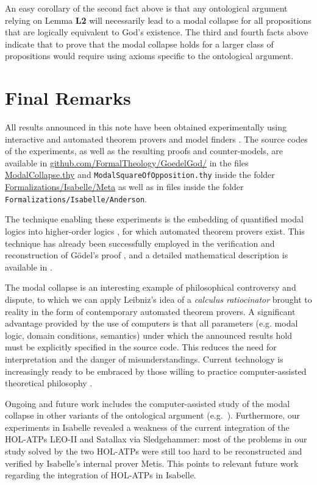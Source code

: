 \documentclass{birkmult}
\theoremstyle{definition}
\theoremstyle{remark}
\numberwithin{equation}{section}
\begin{document}
An easy corollary of the second fact above is that any ontological argument relying on Lemma \textbf{L2} will necessarily lead to a modal collapse for all propositions that are logically equivalent to God's existence. The third and fourth facts above indicate that to prove that the modal collapse holds for a larger class of propositions would require using axioms specific to the ontological argument.




\section{Final Remarks}

\sloppy All results announced in this note have been 
obtained experimentally using interactive and 
automated theorem provers and model finders
\cite{LEO,Satallax,Isabelle,Coq,Nitpick}.  
The source codes of the experiments, 
as well as the resulting proofs and counter-models, 
are available in
\url{github.com/FormalTheology/GoedelGod/}
in the files \url{ModalCollapse.thy} and \texttt{ModalSquareOfOpposition.thy} inside the folder \url{Formalizations/Isabelle/Meta} as well as in files inside the folder \texttt{Formalizations/Isabelle/Anderson}.

The technique enabling these experiments is the embedding of 
quantified modal logics into higher-order logics 
\cite{J23,B9,C36}, for which automated theorem provers exist. 
This technique has already been successfully employed in the 
verification and reconstruction of G\"odel's proof 
\cite{J28,J30,J29}, and a detailed 
mathematical description is available in \cite{C40}.

The modal collapse is an interesting example of philosophical 
controversy and dispute, to which we can apply Leibniz's idea 
of a \emph{calculus ratiocinator} brought to reality in the 
form of contemporary automated theorem provers. 
A significant advantage provided by the use of computers is 
that all parameters (e.g. modal logic, domain conditions, 
semantics) under which the announced results hold must be 
explicitly specified in the source code. This reduces the need 
for interpretation and the danger of misunderstandings. 
Current technology is increasingly ready to be embraced by 
those willing to practice computer-assisted theoretical 
philosophy \cite{oppenheimera11,rushby13}.

Ongoing and future work includes the computer-assisted 
study of the modal collapse in
other variants of the ontological argument (e.g.~\cite{bjordal99,fuhrmann05:_exist_notwen}). Furthermore, our experiments in Isabelle revealed a weakness of the current integration of the HOL-ATPs LEO-II and Satallax via Sledgehammer: most of the problems in our study solved by the two HOL-ATPs were still too hard to be reconstructed and verified by Isabelle's internal prover Metis. This points to relevant future work regarding the integration of HOL-ATPs in Isabelle.
 
\end{document}
